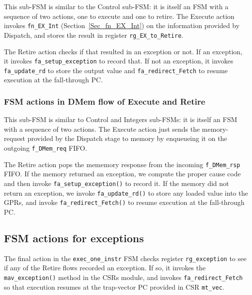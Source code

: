 This sub-FSM is similar to the Control sub-FSM: it is itself an FSM
with a sequence of two actions, one to execute and one to retire.  The
Execute action invokes \verb|fn_EX_Int| (Section~\ref{Sec_fn_EX_Int})
on the information provided by Dispatch, and stores the result in
register \verb|rg_EX_to_Retire|.

The Retire action checks if that resulted in an exception or not. If
an exception, it invokes \verb|fa_setup_exception| to record that.  If
not an exception, it invokes \verb|fa_update_rd| to store the output
value and \verb|fa_redirect_Fetch| to resume execution at the
fall-through PC.


\subsubsection{FSM actions in DMem flow of Execute and Retire}



This sub-FSM is similar to Control and Integers sub-FSMs: it is itself
an FSM with a sequence of two actions.  The Execute action just sends
the memory-request provided by the Dispatch stage to memory by
enqueueing it on the outgoing \verb|f_DMem_req| FIFO.

The Retire action pops the mememory response from the incoming
\verb|f_DMem_rsp| FIFO.  If the memory returned an exception, we
compute the proper cause code and then invoke
\verb|fa_setup_exception()| to record it.  If the memory did not
return an exception, we invoke \verb|fa_update_rd()| to store any
loaded value into the GPRs, and invoke \verb|fa_redirect_Fetch()| to
resume execution at the fall-through PC.


\subsection{FSM actions for exceptions}



The final action in the \verb|exec_one_instr| FSM checks register
\verb|rg_exception| to see if any of the Retire flows recorded an
exception.  If so, it invokes the \verb|mav_exception()| method in the
CSRs module, and invokes \verb|fa_redirect_Fetch| so that execution
resumes at the trap-vector PC provided in CSR \verb|mt_vec|.


